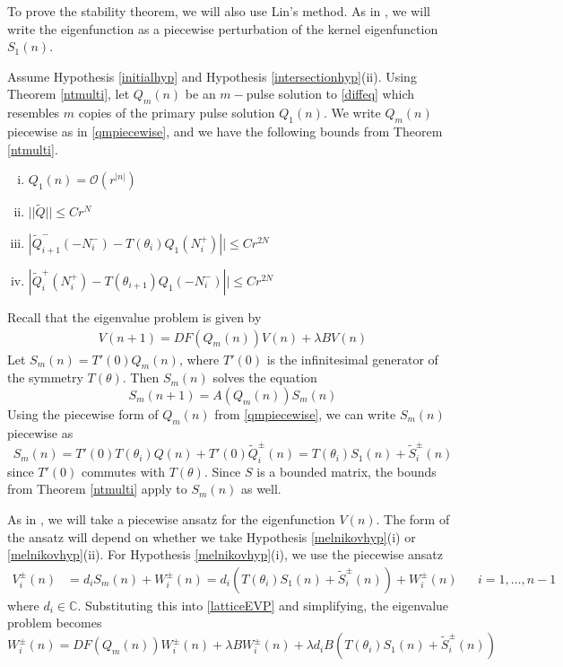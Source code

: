 \documentclass[12pt]{article}
\def\C{{\mathbb C}}
\begin{document}
To prove the stability theorem, we will also use Lin's method. As in \cite{Sandstede1998}, we will write the eigenfunction as a piecewise perturbation of the kernel eigenfunction $S_1(n)$. 

Assume Hypothesis \ref{initialhyp} and Hypothesis \ref{intersectionhyp}(ii). Using Theorem \ref{ntmulti}, let $Q_m(n)$ be an $m-$pulse solution to \eqref{diffeq} which resembles $m$ copies of the primary pulse solution $Q_1(n)$. We write $Q_m(n)$ piecewise as in \eqref{qmpiecewise}, and we have the following bounds from Theorem \ref{ntmulti}.
\begin{enumerate}[(i)]
\item $Q_1(n) = \mathcal{O}(r^|n|)$
\item $||\tilde{Q}|| \leq C r^N$
\item $|\tilde{Q}_{i+1}^-(-N_i^-) - T(\theta_i) Q_1(N_i^+)|| \leq C r^{2N}$ 
\item $|\tilde{Q}_i^+(N_i^+) - T(\theta_{i+1}) Q_1(-N_i^-)|| \leq C r^{2N}$
\end{enumerate}

Recall that the eigenvalue problem is given by 
\begin{align*}
V(n+1) = DF(Q_m(n)) V(n) + \lambda B V(n)
\end{align*}
Let $S_m(n) = T'(0) Q_m(n)$, where $T'(0)$ is the infinitesimal generator of the symmetry $T(\theta)$. Then $S_m(n)$ solves the equation
\begin{equation}\label{Smsolves}
S_m(n+1) = A(Q_m(n))S_m(n)
\end{equation}
Using the piecewise form of $Q_m(n)$ from \eqref{qmpiecewise}, we can write $S_m(n)$ piecewise as 
\begin{equation}\label{Smdef}
S_m(n) = T'(0) T(\theta_i) Q(n) + T'(0) \tilde{Q}_i^\pm(n)
= T(\theta_i) S_1(n) + \tilde{S}_i^\pm(n)
\end{equation}
since $T'(0)$ commutes with $T(\theta)$. Since $S$ is a bounded matrix, the bounds from Theorem \ref{ntmulti} apply to $S_m(n)$ as well.

As in \cite{Sandstede1998}, we will take a piecewise ansatz for the eigenfunction $V(n)$. The form of the ansatz will depend on whether we take Hypothesis \ref{melnikovhyp}(i) or \ref{melnikovhyp}(ii). For Hypothesis \ref{melnikovhyp}(i), we use the piecewise ansatz
\begin{align*}
V_i^\pm(n) &= d_i S_m(n) + W_i^\pm(n) = d_i ( T(\theta_i) S_1(n) + \tilde{S}_i^\pm(n) ) + W_i^\pm(n)
&& i = 1, \dots, n-1
\end{align*}
where $d_i \in \C$. Substituting this into \eqref{latticeEVP} and simplifying, the eigenvalue problem becomes
\begin{equation}\label{EVPhypi}
W_i^\pm(n) = DF(Q_m(n)) W_i^\pm(n) + \lambda B W_i^\pm(n) + \lambda d_i B ( T(\theta_i) S_1(n) + \tilde{S}_i^\pm(n))
\end{equation}
\end{document}
